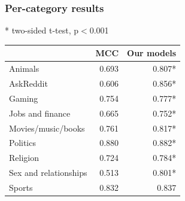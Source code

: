 \documentclass{beamer}
\begin{document}
\begin{frame}
  \frametitle{Per-category results}
  * two-sided t-test, p$<$0.001
\begin{table}[t]
\centering
{\small
\begin{tabular}{lrr}
\toprule
                      & MCC   & Our models \\
\midrule
Animals               & 0.693 & 0.807*      \\
AskReddit             & 0.606  & 0.856*      \\
Gaming                & 0.754  & 0.777*     \\
Jobs and finance      & 0.665 & 0.752*      \\
Movies/music/books    & 0.761 & 0.817*      \\
Politics              & 0.880  & 0.882*      \\
Religion              & 0.724  & 0.784*      \\
Sex and relationships & 0.513 & 0.801*      \\
Sports                & 0.832  & 0.837\phantom{*}     \\
\bottomrule
\end{tabular}}
\end{table}
\end{frame}
\end{document}
